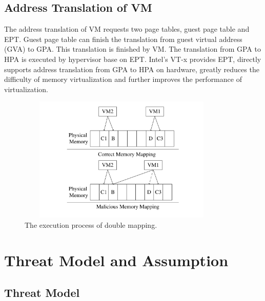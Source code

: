 \documentclass[conference]{IEEEtran}
\begin{document}


\subsection{Address Translation of VM}
The address translation of VM requests two page tables, guest page table and EPT. Guest page table can finish the translation from guest virtual address (GVA) to GPA. This translation is finished by VM. The translation from GPA to HPA is executed by hypervisor base on EPT.
Intel's VT-x provides EPT, directly supports address translation from GPA to HPA on hardware, greatly reduces the difficulty of memory virtualization and further improves the performance of virtualization.





%
%


\begin{figure}
\centerline{\includegraphics[width=10cm, height=6cm]{pdfvmcs.pdf}}%
\caption{The execution process of double mapping. } \label{fig0}
\end{figure}

\section{Threat Model and Assumption}\label{sec:threat}


\subsection{Threat Model} \label {threat}
\end{document}
